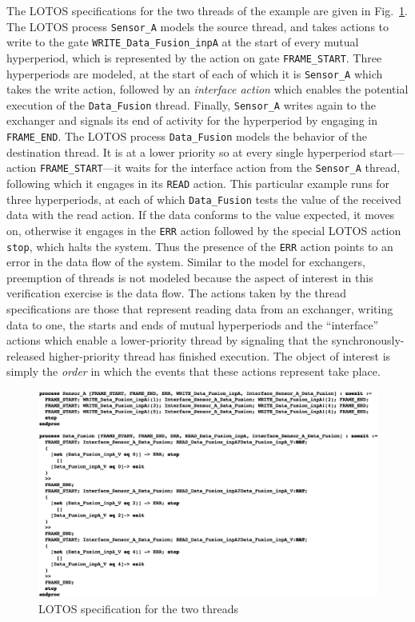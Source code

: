 The LOTOS specifications for the two threads of the example are given
in Fig.~\ref{fig:lotos_proc_code}. The LOTOS process
\texttt{Sensor\_A} models the source thread, and takes actions to
write to the gate \texttt{WRITE\_Data\_Fusion\_inpA} at the start of
every mutual hyperperiod, which is represented by the action on gate
\texttt{FRAME\_START}. Three hyperperiods are modeled, at the start of
each of which it is \texttt{Sensor\_A} which takes the write action,
followed by an \emph{interface action} which enables the potential
execution of the \texttt{Data\_Fusion} thread. Finally,
\texttt{Sensor\_A} writes again to the exchanger and signals its end
of activity for the hyperperiod by engaging in
\texttt{FRAME\_END}. The LOTOS process \texttt{Data\_Fusion} models
the behavior of the destination thread. It is at a lower priority so
at every single hyperperiod start---action \texttt{FRAME\_START}---it
waits for the interface action from the \texttt{Sensor\_A} thread,
following which it engages in its \texttt{READ} action. This
particular example runs for three hyperperiods, at each of which
\texttt{Data\_Fusion} tests the value of the received data with the
read action. If the data conforms to the value expected, it moves on,
otherwise it engages in the \texttt{ERR} action followed by the
special LOTOS action \texttt{stop}, which halts the system. Thus the
presence of the \texttt{ERR} action points to an error in the data
flow of the system. Similar to the model for exchangers, preemption of
threads is not modeled because the aspect of interest in this
verification exercise is the data flow. The actions taken by the
thread specifications are those that represent reading data from an
exchanger, writing data to one, the starts and ends of mutual
hyperperiods and the ``interface'' actions which enable a
lower-priority thread by signaling that the synchronously-released
higher-priority thread has finished execution. The object of interest
is simply the \emph{order} in which the events that these actions
represent take place.

\begin{figure}
\centering
\includegraphics[scale=0.7, angle=90]{figs/lotos_proc_code}
\caption{LOTOS specification for the two threads}
\label{fig:lotos_proc_code}
\end{figure}

